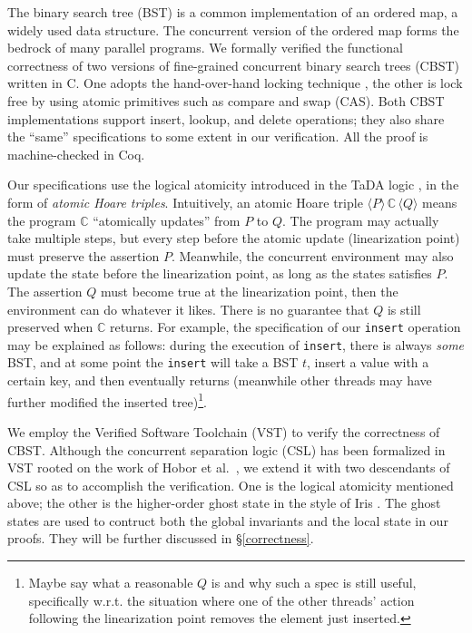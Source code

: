 The binary search tree (BST) is a common implementation of an ordered
map, a widely used data structure. The concurrent version of the
ordered map forms the bedrock of many parallel programs. We formally
verified the functional correctness of two versions of fine-grained
concurrent binary search trees (CBST) written in C. One adopts the
hand-over-hand locking technique \cite{bayer1977}, the other is lock
free by using atomic primitives such as compare and swap (CAS). Both
CBST implementations support insert, lookup, and delete operations; %
they also share the ``same'' specifications to some extent in our
verification. All the proof is machine-checked in Coq. %

Our specifications use the logical atomicity introduced in the TaDA
logic \cite{tada}, in the form of \emph{atomic Hoare
triples}. Intuitively, an atomic Hoare triple $ \langle
P \rangle\,\mathbb{C}\, \langle Q \rangle$ means the program
$\mathbb{C}$ ``atomically updates'' from $P$ to $Q$. The program may
actually take multiple steps, but every step before the atomic update
(linearization point) must preserve the assertion $P$. Meanwhile, the
concurrent environment may also update the state before the
linearization point, as long as the states satisfies $P$. The
assertion $Q$ must become true at the linearization point, then the
environment can do whatever it likes. There is no guarantee that $Q$
is still preserved when $\mathbb{C}$ returns. For example, the
specification of our \texttt{insert} operation may be explained as
follows: during the execution of \texttt{insert}, there is
always \emph{some} BST, and at some point the \texttt{insert} will
take a BST $t$, insert a value with a certain key, and then eventually
returns (meanwhile other threads may have further modified the
inserted tree)\footnote{Maybe say what a reasonable $Q$ is and why such a spec is still useful, specifically w.r.t. the situation where one of the other threads' action following the linearization point removes the element just inserted.}.

We employ the Verified Software Toolchain (VST) \cite{plfcc} to verify
the correctness of CBST. Although the concurrent separation logic
(CSL) has been formalized in VST rooted on the work of Hobor et
al.\ \cite{oraclesematic}, we extend it with two descendants of CSL so
as to accomplish the verification. One is the logical atomicity
mentioned above; the other is the higher-order ghost state in the
style of Iris \cite{higherorderghoststate}. The ghost states are used
to contruct both the global invariants and the local state in our
proofs. They will be further discussed in \S\ref{correctness}.

